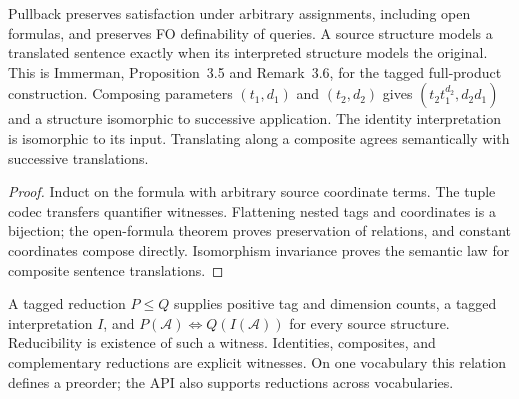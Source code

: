 \begin{theorem}
  \label{thm:desc-tagged-transport}
  \leanok
  Pullback preserves satisfaction under arbitrary assignments, including open
  formulas, and preserves FO definability of queries. A source structure models
  a translated sentence exactly when its interpreted structure models the
  original. This is Immerman, Proposition~3.5 and Remark~3.6, for the tagged
  full-product construction. Composing parameters $(t_1,d_1)$ and $(t_2,d_2)$
  gives $(t_2 t_1^{d_2},d_2d_1)$ and a structure isomorphic to successive
  application. The identity interpretation is isomorphic to its input.
  Translating along a composite agrees semantically with successive translations.
\end{theorem}
\begin{proof}
  \leanok
  Induct on the formula with arbitrary source coordinate terms. The tuple codec
  transfers quantifier witnesses. Flattening nested tags and coordinates is a
  bijection; the open-formula theorem proves preservation of relations, and
  constant coordinates compose directly. Isomorphism invariance proves the
  semantic law for composite sentence translations.
\end{proof}

\begin{definition}
  \label{def:desc-tagged-reduction}
  \leanok
  A tagged reduction $P \leq Q$ supplies positive tag and dimension counts,
  a tagged interpretation $I$, and $P(\mathcal A)\iff Q(I(\mathcal A))$ for
  every source structure. Reducibility is existence of such a witness.
  Identities, composites, and complementary reductions are explicit witnesses.
  On one vocabulary this relation defines a preorder; the API also supports
  reductions across vocabularies.
\end{definition}


